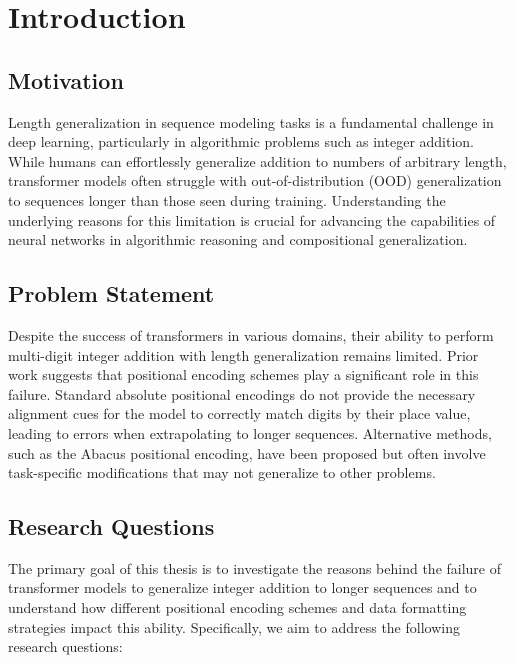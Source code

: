 \chapter{Introduction}\label{introduction}

\section{Motivation}

Length generalization in sequence modeling tasks is a fundamental challenge in deep learning, particularly in algorithmic problems such as integer addition. While humans can effortlessly generalize addition to numbers of arbitrary length, transformer models often struggle with out-of-distribution (OOD) generalization to sequences longer than those seen during training. Understanding the underlying reasons for this limitation is crucial for advancing the capabilities of neural networks in algorithmic reasoning and compositional generalization.

\section{Problem Statement}

Despite the success of transformers in various domains, their ability to perform multi-digit integer addition with length generalization remains limited. Prior work suggests that positional encoding schemes play a significant role in this failure. Standard absolute positional encodings do not provide the necessary alignment cues for the model to correctly match digits by their place value, leading to errors when extrapolating to longer sequences. Alternative methods, such as the Abacus positional encoding, have been proposed but often involve task-specific modifications that may not generalize to other problems.

\section{Research Questions}

The primary goal of this thesis is to investigate the reasons behind the failure of transformer models to generalize integer addition to longer sequences and to understand how different positional encoding schemes and data formatting strategies impact this ability. Specifically, we aim to address the following research questions:

